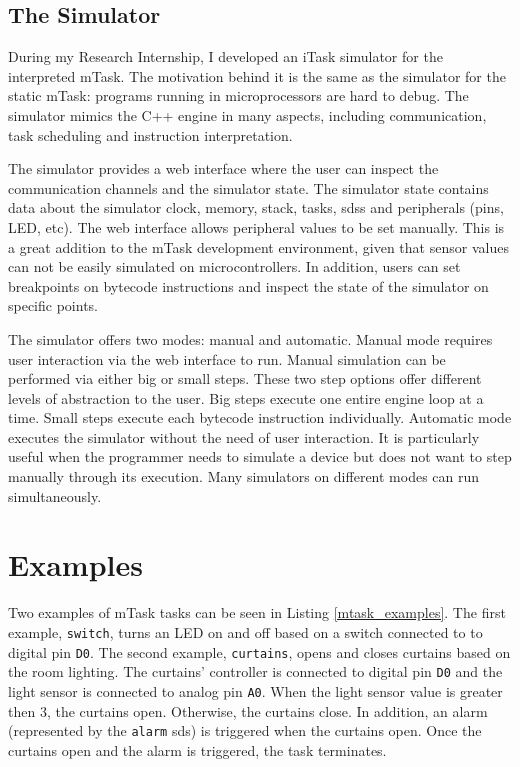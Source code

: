 \subsection{The Simulator}

During my Research Internship, I developed an iTask simulator for the interpreted mTask. The motivation behind it is the same as the simulator for the static mTask: programs running in microprocessors are hard to debug. The simulator mimics the C++ engine in many aspects, including communication, task scheduling and instruction interpretation. 

The simulator provides a web interface where the user can inspect the communication channels and the simulator state. The simulator state contains data about the simulator clock, memory, stack, tasks, \acp{sds} and peripherals (pins, LED, etc). The web interface allows peripheral values to be set manually. This is a great addition to the mTask development environment, given that sensor values can not be easily simulated on microcontrollers. In addition, users can set breakpoints on bytecode instructions and inspect the state of the simulator on specific points.

The simulator offers two modes: manual and automatic. Manual mode requires user interaction via the web interface to run. Manual simulation can be performed via either big or small steps. These two step options offer different levels of abstraction to the user. Big steps execute one entire engine loop at a time. Small steps execute each bytecode instruction individually. Automatic mode executes the simulator without the need of user interaction. It is particularly useful when the programmer needs to simulate a device but does not want to step manually through its execution. Many simulators on different modes can run simultaneously.

\section{Examples}

Two examples of mTask tasks can be seen in Listing \ref{mtask_examples}. The first example, \texttt{switch}, turns an LED on and off based on a switch connected to to digital pin \texttt{D0}. The second example, \texttt{curtains}, opens and closes curtains based on the room lighting. The curtains' controller is connected to digital pin \texttt{D0} and the light sensor is connected to analog pin \texttt{A0}. When the light sensor value is greater then 3, the curtains open. Otherwise, the curtains close. In addition, an alarm (represented by the \texttt{alarm} \ac{sds}) is triggered when the curtains open. Once the curtains open and the alarm is triggered, the task terminates.

